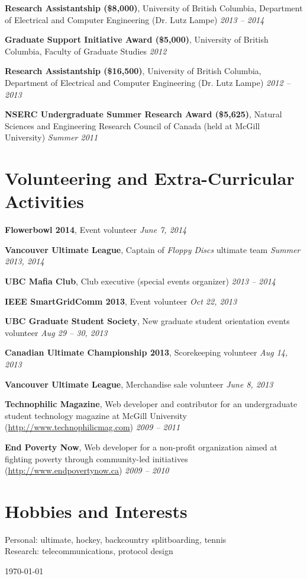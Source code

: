 \documentclass[letterpaper]{article}
\newcommand{\itemdescription}[3]{
  \textbf{#1}, {#2} \hfill \emph{#3}\\
  \medskip
}
\begin{document}
\itemdescription{Research Assistantship (\$8,000)}{University of British
Columbia, Department of Electrical and Computer Engineering (Dr. Lutz
Lampe)}{2013 -- 2014}

\itemdescription{Graduate Support Initiative Award (\$5,000)}{University of
British Columbia, Faculty of Graduate Studies}{2012}
\itemdescription{Research Assistantship (\$16,500)}{University of British 
Columbia, Department of Electrical and Computer Engineering (Dr. Lutz 
Lampe)}{2012 -- 2013}

\itemdescription{NSERC Undergraduate Summer Research Award (\$5,625)}{Natural 
Sciences and Engineering Research Council of Canada (held at McGill
University)}{Summer 2011}
\medskip

\section*{Volunteering and Extra-Curricular Activities}
\itemdescription{Flowerbowl 2014}{Event volunteer}{June 7, 2014}

\itemdescription{Vancouver Ultimate League}{Captain of \emph{Floppy Discs}
ultimate team}{Summer 2013, 2014}

\itemdescription{UBC Mafia Club}{Club executive (special events organizer)}{2013
-- 2014}

\itemdescription{IEEE SmartGridComm 2013}{Event volunteer}{Oct 22,
2013}

\itemdescription{UBC Graduate Student Society}{New graduate student orientation
events volunteer}{Aug 29 -- 30, 2013}

\itemdescription{Canadian Ultimate Championship
2013}{Scorekeeping volunteer}{Aug 14, 2013}

\itemdescription{Vancouver Ultimate League}{Merchandise
sale volunteer}{June 8, 2013}

\itemdescription{Technophilic Magazine}{Web developer and contributor for an
undergraduate student technology magazine at McGill University
(\url{http://www.technophilicmag.com})}{2009 -- 2011}

\itemdescription{End Poverty Now}{Web developer for a non-profit organization 
aimed at fighting poverty through community-led initiatives
(\url{http://www.endpovertynow.ca})}{2009 -- 2010}
\medskip

\section*{Hobbies and Interests}
Personal: ultimate, hockey, backcountry splitboarding, tennis \\
Research: telecommunications, protocol design

\vfill \hfill \usdate\today
\end{document}
